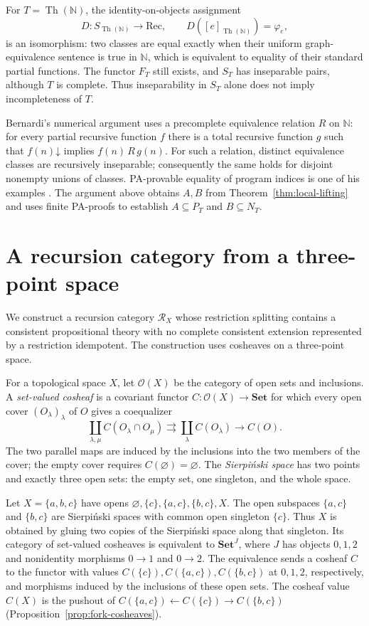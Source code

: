 \documentclass[11pt]{article}
\newcommand{\N}{\mathbb N}
\begin{document}
For $T=\operatorname{Th}(\N)$, the identity-on-objects assignment
\[
 D:S_{\operatorname{Th}(\N)}\longrightarrow\mathrm{Rec},\qquad
 D([e]_{\operatorname{Th}(\N)})=\varphi_e,
\]
is an isomorphism: two classes are equal exactly when their uniform
graph-equivalence sentence is true in $\N$, which is equivalent
to equality of their standard partial functions.
The functor $F_T$ still exists, and $S_T$ has inseparable pairs,
although $T$ is complete.
Thus inseparability in $S_T$ alone does not imply incompleteness of $T$.

Bernardi's numerical argument uses a precomplete equivalence
relation $R$ on $\N$: for every partial recursive function $f$
there is a total recursive function $g$ such that
$f(n)\mathord\downarrow$ implies $f(n)\,R\,g(n)$.
For such a relation, distinct equivalence classes are recursively
inseparable; consequently the same holds for disjoint nonempty
unions of classes. PA-provable equality of program indices is
one of his examples \cite[pp.~125--126]{Bernardi}.
The argument above obtains $A,B$ from
Theorem~\ref{thm:local-lifting} and uses finite PA-proofs to
establish $A\subseteq P_T$ and $B\subseteq N_T$.

\section{A recursion category from a three-point space}\label{sec:cosheaves}

We construct a recursion category $\mathscr R_X$ whose restriction
splitting contains a consistent propositional theory with no complete
consistent extension represented by a restriction idempotent.
The construction uses cosheaves on a three-point space.

For a topological space $X$, let $\mathcal O(X)$ be the category
of open sets and inclusions. A \emph{set-valued cosheaf} is a
covariant functor $C:\mathcal O(X)\to\mathbf{Set}$ for which
every open cover $(O_\lambda)_\lambda$ of $O$ gives a coequalizer
\cite[Definition 2.6]{CurryCosheaves}
\[
 \coprod_{\lambda,\mu} C(O_\lambda\cap O_\mu)
 \rightrightarrows \coprod_\lambda C(O_\lambda)
 \longrightarrow C(O).
\]
The two parallel maps are induced by the inclusions into the two
members of the cover; the empty cover requires
$C(\varnothing)=\varnothing$.
The \emph{Sierpi\'nski space} has two points and exactly three open
sets: the empty set, one singleton, and the whole space.

Let $X=\{a,b,c\}$ have opens
$\varnothing,\{c\},\{a,c\},\{b,c\},X$.
The open subspaces $\{a,c\}$ and $\{b,c\}$ are Sierpi\'nski spaces
with common open singleton $\{c\}$. Thus $X$ is obtained by gluing
two copies of the Sierpi\'nski space along that singleton.
Its category of set-valued cosheaves is equivalent to
$\mathbf{Set}^{J}$, where $J$ has objects $0,1,2$ and nonidentity
morphisms $0\to1$ and $0\to2$.
The equivalence sends a cosheaf $C$ to the functor with values
$C(\{c\}),C(\{a,c\}),C(\{b,c\})$ at $0,1,2$, respectively,
and morphisms induced by the inclusions of these open sets.
The cosheaf value $C(X)$ is the pushout of
$C(\{a,c\})\leftarrow C(\{c\})\to C(\{b,c\})$
(Proposition~\ref{prop:fork-cosheaves}).
\end{document}
